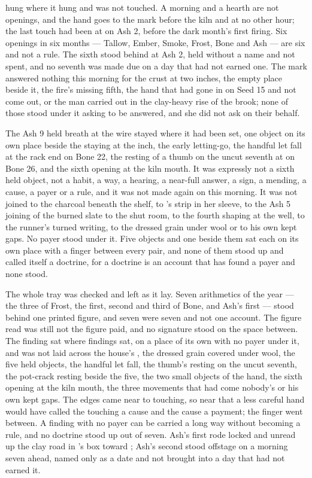  hung where it hung and was not touched. A morning and a hearth are not openings, and the hand goes to the mark before the kiln and at no other hour; the last touch had been at  on Ash 2, before the dark month's first firing. Six openings in six months --- Tallow, Ember, Smoke, Frost, Bone and Ash --- are six and not a rule. The sixth stood behind at Ash 2, held without a name and not spent, and no seventh was made due on a day that had not earned one. The mark answered nothing this morning for the crust at two inches, the empty place beside it, the fire's missing fifth, the hand that had gone in on Seed 15 and not come out, or the man carried out in the clay-heavy rise of the brook; none of those stood under it asking to be answered, and she did not ask on their behalf.

The Ash 9 held breath at the wire stayed where it had been set, one object on its own place beside the staying at the inch, the early letting-go, the handful let fall at the rack end on Bone 22, the resting of a thumb on the uncut seventh at  on Bone 26, and the sixth opening at the kiln mouth. It was expressly not a sixth held object, not a habit, a way, a hearing, a near-full answer, a sign, a mending, a cause, a payer or a rule, and it was not made again on this morning. It was not joined to the charcoal beneath the shelf, to 's strip in her sleeve, to the Ash 5 joining of the burned slate to the shut room, to the fourth shaping at the well, to the runner's turned writing, to the dressed grain under wool or to his own kept gaps. No payer stood under it. Five objects and one beside them sat each on its own place with a finger between every pair, and none of them stood up and called itself a doctrine, for a doctrine is an account that has found a payer and none stood.

\scenebreak

The whole tray was checked and left as it lay. Seven arithmetics of the year --- the three of Frost, the first, second and third of Bone, and Ash's first --- stood behind one printed figure, and seven were seven and not one account. The figure read was still not the figure paid, and no signature stood on the space between. The finding sat where findings sat, on a place of its own with no payer under it, and was not laid across the house's , the dressed grain covered under wool, the five held objects, the handful let fall, the thumb's resting on the uncut seventh, the pot-crack resting beside the five, the two small objects of the hand, the sixth opening at the kiln mouth, the three movements that had come nobody's or his own kept gaps. The edges came near to touching, so near that a less careful hand would have called the touching a cause and the cause a payment; the finger went between. A finding with no payer can be carried a long way without becoming a rule, and no doctrine stood up out of seven. Ash's first rode locked and unread up the clay road in 's box toward ; Ash's second stood offstage on a morning seven ahead, named only as a date and not brought into a day that had not earned it.

